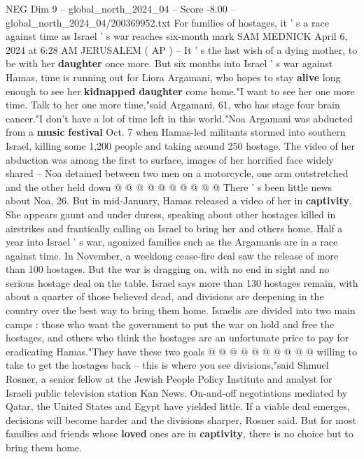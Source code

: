 \begin{textsample}{NEG Dim 9 – global\_north\_2024\_04 – Score -8.00 – global\_north\_2024\_04/200369952.txt}  \label{ex:f9_neg_265}
For families of hostages, it ' s a race against time as Israel ' s war reaches six-month mark SAM MEDNICK April 6, 2024 at 6:28 AM JERUSALEM ( AP ) -- It ' s the last wish of a dying mother, to be with her \textbf{daughter} once more.
But six months into Israel ' s war against Hamas, time is running out for Liora Argamani, who hopes to stay \textbf{alive} long enough to see her \textbf{kidnapped} \textbf{daughter} come home."I want to see her one more time.
Talk to her one more time,"said Argamani, 61, who has stage four brain cancer."I don't have a lot of time left in this world."Noa Argamani was abducted from a \textbf{music} \textbf{festival} Oct. 7 when Hamas-led militants stormed into southern Israel, killing some 1,200 people and taking around 250 hostage.
The video of her abduction was among the first to surface, images of her horrified face widely shared -- Noa detained between two men on a motorcycle, one arm outstretched and the other held down @ @ @ @ @ @ @ @ @ @ There ' s been little news about Noa, 26.
But in mid-January, Hamas released a video of her in \textbf{captivity}.
She appears gaunt and under duress, speaking about other hostages killed in airstrikes and frantically calling on Israel to bring her and others home.
Half a year into Israel ' s war, agonized families such as the Argamanis are in a race against time.
In November, a weeklong cease-fire deal saw the release of more than 100 hostages.
But the war is dragging on, with no end in sight and no serious hostage deal on the table.
Israel says more than 130 hostages remain, with about a quarter of those believed dead, and divisions are deepening in the country over the best way to bring them home.
Israelis are divided into two main camps : those who want the government to put the war on hold and free the hostages, and others who think the hostages are an unfortunate price to pay for eradicating Hamas."They have these two goals @ @ @ @ @ @ @ @ @ @ willing to take to get the hostages back -- this is where you see divisions,"said Shmuel Rosner, a senior fellow at the Jewish People Policy Institute and analyst for Israeli public television station Kan News.
On-and-off negotiations mediated by Qatar, the United States and Egypt have yielded little.
If a viable deal emerges, decisions will become harder and the divisions sharper, Rosner said.
But for most families and friends whose \textbf{loved} ones are in \textbf{captivity}, there is no choice but to bring them home.

\end{textsample}
